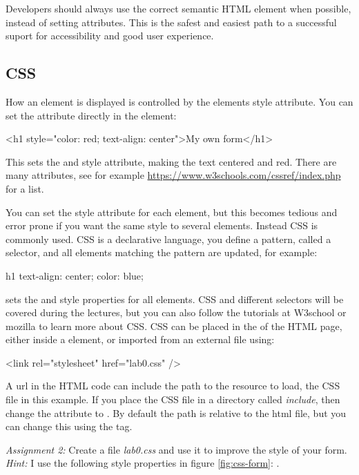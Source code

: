 \documentclass[fleqn, article, a4paper]{memoir}
\begin{document}
Developers should always use the correct semantic HTML element when possible, instead of setting  attributes. This is the safest and easiest path to a successful suport for accessibility and good user experience.

\subsection*{CSS}
How an element is displayed is controlled by the elements style attribute. You can set the attribute directly in the element: 
\begin{Code}
<h1 style="color: red; text-align: center">My own form</h1>
\end{Code}
This sets the  and  style attribute, making the text centered and red. There are many attributes, see for example \url{https://www.w3schools.com/cssref/index.php} for a list.

You can set the style attribute for each element, but this becomes tedious and error prone if you want the same style to several elements. Instead CSS is commonly used. CSS is a declarative language, you define a pattern, called a selector, and all elements matching the pattern are updated, for example:
\begin{Code}
h1 {
  text-align: center;
  color: blue;
}
\end{Code}
sets the  and  style properties for all  elements. CSS and different selectors will be covered during the lectures, but you can also follow the tutorials at W3school or mozilla to learn more about CSS. CSS can be placed in the  of the HTML page, either inside a  element, or imported from an external file using: 
\begin{Code}
<link rel="stylesheet" href="lab0.css" />
\end{Code}
A url in the HTML code can include the path to the resource to load, the CSS file in this example. If you place the CSS file in a directory called \emph{include}, then change the attribute to . By default the path is relative to the html file, but you can change this using the  tag.

\noindent \emph{Assignment 2:} Create a file \emph{lab0.css} and use it to improve the style of your form.
\emph{Hint:} I use the following style properties in figure \ref{fig:css-form}: .
\end{document}
